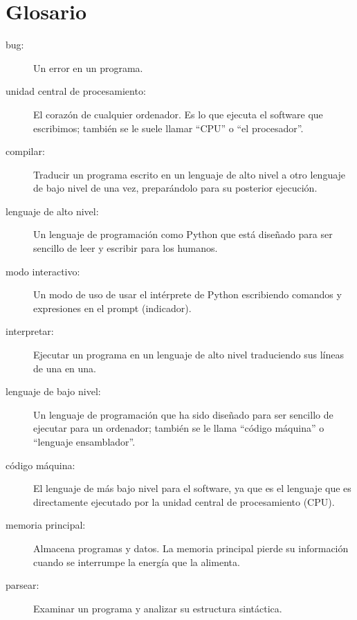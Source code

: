 \section{Glosario}

\begin{description}

\item[bug:]  Un error en un programa.

\item[unidad central de procesamiento:] El corazón de cualquier ordenador. Es lo que
ejecuta el software que escribimos; también se le suele llamar ``CPU'' o ``el procesador''.

\item[compilar:]  Traducir un programa escrito en un lenguaje de alto nivel
a otro lenguaje de bajo nivel de una vez, preparándolo para su posterior
ejecución.

\item[lenguaje de alto nivel:]  Un lenguaje de programación como Python que
está diseñado para ser sencillo de leer y escribir para los humanos.

\item[modo interactivo:] Un modo de uso de usar el intérprete de Python
escribiendo comandos y expresiones en el prompt (indicador).

\item[interpretar:]  Ejecutar un programa en un lenguaje de alto nivel
traduciendo sus líneas de una en una.

\item[lenguaje de bajo nivel:]  Un lenguaje de programación que ha sido diseñado
para ser sencillo de ejecutar para un ordenador; también se le llama ``código máquina''
o ``lenguaje ensamblador''.

\item[código máquina:]  El lenguaje de más bajo nivel para el software, ya que
es el lenguaje que es directamente ejecutado por la unidad central de procesamiento
(CPU).

\item[memoria principal:] Almacena programas y datos. La memoria principal pierde
su información cuando se interrumpe la energía que la alimenta.

\item[parsear:]  Examinar un programa y analizar su estructura sintáctica.


\end{description}
